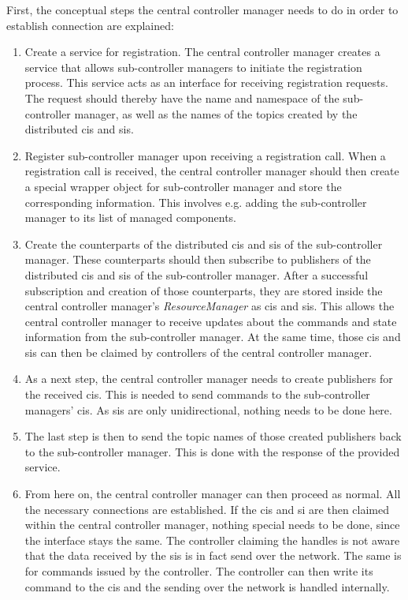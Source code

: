 First, the conceptual steps the central controller manager needs to do in order to establish connection are explained:
\begin{enumerate}
    \item Create a service for registration. The central controller manager creates a service that allows sub-controller managers to initiate the registration process. This service acts as an interface for receiving registration requests. The request should thereby have the name and namespace of the sub-controller manager, as well as the names of the topics created by the distributed \glspl{ci} and \glspl{si}. 

    \item Register sub-controller manager upon receiving a registration call. When a registration call is received, the central controller manager should then create a special wrapper object for sub-controller manager and store the corresponding information. This involves e.g. adding the sub-controller manager to its list of managed components.

    \item Create the counterparts of the distributed \glspl{ci} and \glspl{si} of the sub-controller manager. These counterparts should then subscribe to publishers of the distributed \glspl{ci} and \glspl{si} of the sub-controller manager. After a successful subscription and creation of those counterparts, they are stored inside the central controller manager's \textit{ResourceManager} as \glspl{ci} and \glspl{si}. This allows the central controller manager to receive updates about the commands and state information from the sub-controller manager. At the same time, those \glspl{ci} and \glspl{si} can then be claimed by controllers of the central controller manager.

    \item As a next step, the central controller manager needs to create publishers for the received \glspl{ci}. This is needed to send commands to the sub-controller managers' \glspl{ci}. As \glspl{si} are only unidirectional, nothing needs to be done here. 
    
    \item The last step is then to send the topic names of those created publishers back to the sub-controller manager. This is done with the response of the provided service. 

    \item From here on, the central controller manager can then proceed as normal. All the necessary connections are established. If the \glspl{ci} and \gls{si} are then claimed within the central controller manager, nothing special needs to be done, since the interface stays the same. The controller claiming the handles is not aware that the data received by the \glspl{si} is in fact send over the network. The same is for commands issued by the controller. The controller can then write its command to the \glspl{ci} and the sending over the network is handled internally.
\end{enumerate}

